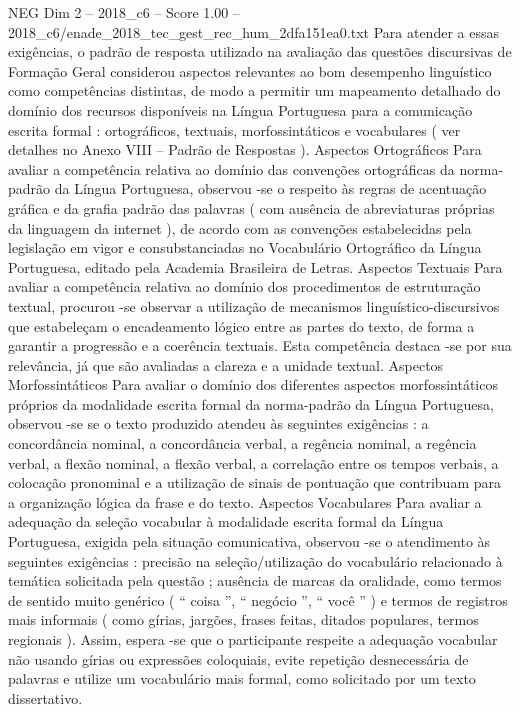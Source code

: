 \begin{textsample}{NEG Dim 2 – 2018\_c6 – Score 1.00 – 2018\_c6/enade\_2018\_tec\_gest\_rec\_hum\_2dfa151ea0.txt}
Para atender a essas exigências, o padrão de resposta utilizado na avaliação das questões discursivas de Formação Geral considerou aspectos relevantes ao bom desempenho linguístico como competências distintas, de modo a permitir um mapeamento detalhado do domínio dos recursos disponíveis na Língua Portuguesa para a comunicação escrita formal : ortográficos, textuais, morfossintáticos e vocabulares ( ver detalhes no Anexo VIII – Padrão de Respostas ).
Aspectos Ortográficos Para avaliar a competência relativa ao domínio das convenções ortográficas da norma-padrão da Língua Portuguesa, observou -se o respeito às regras de acentuação gráfica e da grafia padrão das palavras ( com ausência de abreviaturas próprias da linguagem da internet ), de acordo com as convenções estabelecidas pela legislação em vigor e consubstanciadas no Vocabulário Ortográfico da Língua Portuguesa, editado pela Academia Brasileira de Letras.
Aspectos Textuais Para avaliar a competência relativa ao domínio dos procedimentos de estruturação textual, procurou -se observar a utilização de mecanismos linguístico-discursivos que estabeleçam o encadeamento lógico entre as partes do texto, de forma a garantir a progressão e a coerência textuais.
Esta competência destaca -se por sua relevância, já que são avaliadas a clareza e a unidade textual.
Aspectos Morfossintáticos Para avaliar o domínio dos diferentes aspectos morfossintáticos próprios da modalidade escrita formal da norma-padrão da Língua Portuguesa, observou -se se o texto produzido atendeu às seguintes exigências : a concordância nominal, a concordância verbal, a regência nominal, a regência verbal, a flexão nominal, a flexão verbal, a correlação entre os tempos verbais, a colocação pronominal e a utilização de sinais de pontuação que contribuam para a organização lógica da frase e do texto.
Aspectos Vocabulares Para avaliar a adequação da seleção vocabular à modalidade escrita formal da Língua Portuguesa, exigida pela situação comunicativa, observou -se o atendimento às seguintes exigências : precisão na seleção/utilização do vocabulário relacionado à temática solicitada pela questão ; ausência de marcas da oralidade, como termos de sentido muito genérico ( “ coisa ”, “ negócio ”, “ você ” ) e termos de registros mais informais ( como gírias, jargões, frases feitas, ditados populares, termos regionais ).
Assim, espera -se que o participante respeite a adequação vocabular não usando gírias ou expressões coloquiais, evite repetição desnecessária de palavras e utilize um vocabulário mais formal, como solicitado por um texto dissertativo.

\end{textsample}
